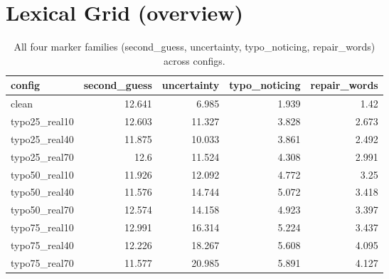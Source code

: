 \documentclass[11pt]{article}
\begin{document}
\section*{Lexical Grid (overview)}
\begin{table}[H]
\centering
\caption{All four marker families (second\_guess, uncertainty, typo\_noticing, repair\_words) across configs.}
\small
\begin{adjustbox}{max width=\textwidth}
\begin{tabular}{lrrrr}
\toprule
\textbf{config} & \textbf{second\_guess} & \textbf{uncertainty} & \textbf{typo\_noticing} & \textbf{repair\_words} \\
\midrule
clean & 12.641 & 6.985 & 1.939 & 1.42 \\
typo25\_real10 & 12.603 & 11.327 & 3.828 & 2.673 \\
typo25\_real40 & 11.875 & 10.033 & 3.861 & 2.492 \\
typo25\_real70 & 12.6 & 11.524 & 4.308 & 2.991 \\
typo50\_real10 & 11.926 & 12.092 & 4.772 & 3.25 \\
typo50\_real40 & 11.576 & 14.744 & 5.072 & 3.418 \\
typo50\_real70 & 12.574 & 14.158 & 4.923 & 3.397 \\
typo75\_real10 & 12.991 & 16.314 & 5.224 & 3.437 \\
typo75\_real40 & 12.226 & 18.267 & 5.608 & 4.095 \\
typo75\_real70 & 11.577 & 20.985 & 5.891 & 4.127 \\
\bottomrule
\end{tabular}
\end{adjustbox}
\end{table}
\end{document}
